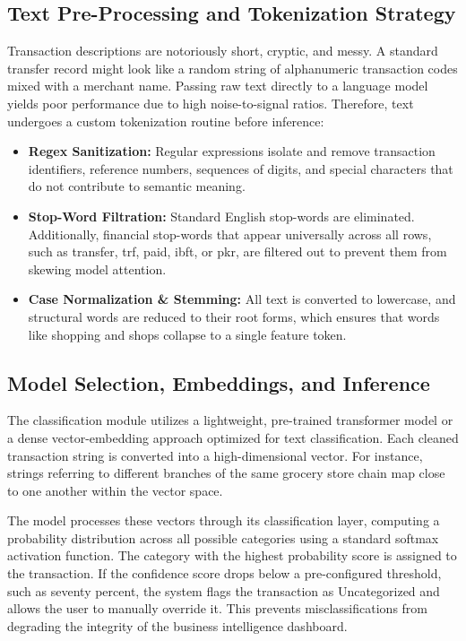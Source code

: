 \subsection{Text Pre-Processing and Tokenization Strategy}
Transaction descriptions are notoriously short, cryptic, and messy. A standard transfer record might look like a random string of alphanumeric transaction codes mixed with a merchant name. Passing raw text directly to a language model yields poor performance due to high noise-to-signal ratios. Therefore, text undergoes a custom tokenization routine before inference:
\begin{itemize}
	\item \textbf{Regex Sanitization:} Regular expressions isolate and remove transaction identifiers, reference numbers, sequences of digits, and special characters that do not contribute to semantic meaning.
	\item \textbf{Stop-Word Filtration:} Standard English stop-words are eliminated. Additionally, financial stop-words that appear universally across all rows, such as transfer, trf, paid, ibft, or pkr, are filtered out to prevent them from skewing model attention.
	\item \textbf{Case Normalization \& Stemming:} All text is converted to lowercase, and structural words are reduced to their root forms, which ensures that words like shopping and shops collapse to a single feature token.
\end{itemize}

\subsection{Model Selection, Embeddings, and Inference}
The classification module utilizes a lightweight, pre-trained transformer model or a dense vector-embedding approach optimized for text classification. Each cleaned transaction string is converted into a high-dimensional vector. For instance, strings referring to different branches of the same grocery store chain map close to one another within the vector space.

The model processes these vectors through its classification layer, computing a probability distribution across all possible categories using a standard softmax activation function. The category with the highest probability score is assigned to the transaction. If the confidence score drops below a pre-configured threshold, such as seventy percent, the system flags the transaction as Uncategorized and allows the user to manually override it. This prevents misclassifications from degrading the integrity of the business intelligence dashboard.

